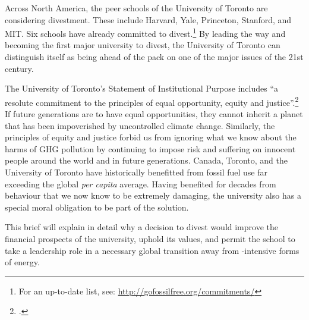 Across North America, the peer schools of the University of Toronto are considering divestment.
These include Harvard, Yale, Princeton, Stanford, and MIT.
Six schools have already committed to divest.\footnote{For an up-to-date list, see: \url{http://gofossilfree.org/commitments/}}
By leading the way and becoming the first major university to divest, the University of Toronto can distinguish itself as being ahead of the pack on one of the major issues of the 21st century.




The University of Toronto's Statement of Institutional Purpose includes ``a resolute commitment to the principles of equal opportunity, equity and justice''.\footcite{InstitutionalPurpose}
If future generations are to have equal opportunities, they cannot inherit a planet that has been impoverished by uncontrolled climate change.
Similarly, the principles of equity and justice forbid us from ignoring what we know about the harms of GHG pollution by continuing to impose risk and suffering on innocent people around the world and in future generations.
Canada, Toronto, and the University of Toronto have historically benefitted from fossil fuel use far exceeding the global \emph{per capita} average.
Having benefited for decades from behaviour that we now know to be extremely damaging, the university also has a special moral obligation to be part of the solution.



This brief will explain in detail why a decision to divest would improve the financial prospects of the university, uphold its values, and permit the school to take a leadership role in a necessary global transition away from -intensive forms of energy. 



